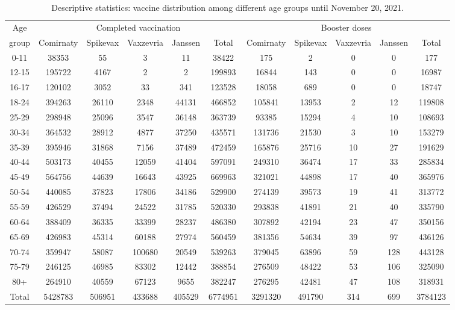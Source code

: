 \documentclass[9pt,onecolumn,twoside,lineno]{pnas-new}
\begin{document}
\begin{sidewaystable}[h]
\centering
\caption{Descriptive statistics: vaccine distribution among different age groups until November 20, 2021.  \vspace{2mm}}
\label{description2}
\begin{tabular}{c|ccccc|ccccc}
\hline
Age & \multicolumn{5}{c|}{Completed vaccination} & 
\multicolumn{5}{c}{Booster doses} \\
group & Comirnaty & Spikevax & Vaxzevria & Janssen & Total
& Comirnaty & Spikevax & Vaxzevria & Janssen & Total \\ \hline
0-11&38353&55&3&11&38422&175&2&0&0&177\\
12-15&195722&4167&2&2&199893&16844&143&0&0&16987\\
16-17&120102&3052&33&341&123528&18058&689&0&0&18747\\
18-24&394263&26110&2348&44131&466852&105841&13953&2&12&119808\\
25-29&298948&25096&3547&36148&363739&93385&15294&4&10&108693\\
30-34&364532&28912&4877&37250&435571&131736&21530&3&10&153279\\
35-39&395946&31868&7156&37489&472459&165876&25716&10&27&191629\\
40-44&503173&40455&12059&41404&597091&249310&36474&17&33&285834\\
45-49&564756&44639&16643&43925&669963&321021&44898&17&40&365976\\
50-54&440085&37823&17806&34186&529900&274139&39573&19&41&313772\\
55-59&426529&37494&24522&31785&520330&293838&41891&21&40&335790\\
60-64&388409&36335&33399&28237&486380&307892&42194&23&47&350156\\
65-69&426983&45314&60188&27974&560459&381356&54634&39&97&436126\\
70-74&359947&58087&100680&20549&539263&379045&63896&59&128&443128\\
75-79&246125&46985&83302&12442&388854&276509&48422&53&106&325090\\
80+&264910&40559&67123&9655&382247&276295&42481&47&108&318931\\
\hline
Total&5428783&506951&433688&405529&6774951&3291320&491790&314&699&3784123\\
\hline
\end{tabular}
\end{sidewaystable}
\end{document}
